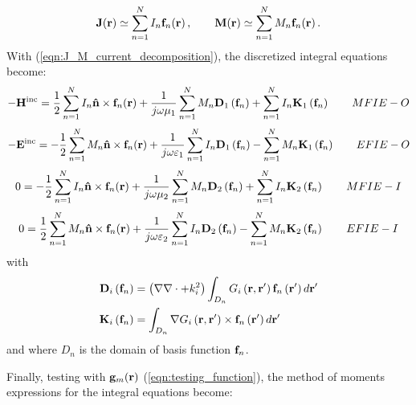\begin{equation}\label{eqn:J_M_current_decomposition}
\mathbf{J}\!\left(\mathbf{r}\right) \simeq \sum_{n = 1}^{N} I_n \mathbf{f}_n \!\left(\mathbf{r}\right), \qquad \mathbf{M}\!\left(\mathbf{r}\right) \simeq \sum_{n = 1}^{N} M_n \mathbf{f}_n \!\left(\mathbf{r}\right).
\end{equation}
With (\ref{eqn:J_M_current_decomposition}), the discretized integral equations become:
\begin{equation}
-\mathbf{H}^\text{inc} =  \frac{1}{2} \sum_{n=1}^N I_n \mathbf{\hat{n}} \times \mathbf{f}_n\!\left(\mathbf{r}\right) + \frac{1}{j \omega \mu_1} \sum_{n=1}^{N} M_n \mathbf{D}_1\left(\mathbf{f}_n\right) + \sum_{n=1}^{N} I_n \mathbf{K}_1\left(\mathbf{f}_n\right) \qquad MFIE-O 
\end{equation}
\begin{equation}
-\mathbf{E}^\text{inc} =  -\frac{1}{2} \sum_{n=1}^N M_n \mathbf{\hat{n}} \times \mathbf{f}_n\!\left(\mathbf{r}\right) + \frac{1}{j \omega \varepsilon_1} \sum_{n=1}^{N} I_n \mathbf{D}_1\left(\mathbf{f}_n\right) -  \sum_{n=1}^{N} M_n \mathbf{K}_1\left(\mathbf{f}_n\right) \qquad EFIE-O 
\end{equation}
\begin{equation}
0 =  -\frac{1}{2} \sum_{n=1}^N I_n \mathbf{\hat{n}} \times \mathbf{f}_n\!\left(\mathbf{r}\right) + \frac{1}{j \omega \mu_2} \sum_{n=1}^{N} M_n \mathbf{D}_2\left(\mathbf{f}_n\right) +  \sum_{n=1}^{N} I_n \mathbf{K}_2\left(\mathbf{f}_n\right) \qquad MFIE-I 
\end{equation}
\begin{equation}
0 =  \frac{1}{2} \sum_{n=1}^N M_n \mathbf{\hat{n}} \times \mathbf{f}_n\!\left(\mathbf{r}\right) + \frac{1}{j \omega \varepsilon_2} \sum_{n=1}^{N} I_n \mathbf{D}_2\left(\mathbf{f}_n\right) -  \sum_{n=1}^{N} M_n \mathbf{K}_2\left(\mathbf{f}_n\right) \qquad EFIE-I 
\end{equation}
with
\begin{align*}
\mathbf{D}_i\left(\mathbf{f}_n\right) &= \left(\nabla \nabla \cdot + k_i^2\right) \int_{D_n} G_i\left(\mathbf{r}, \mathbf{r}'\right) \mathbf{f}_n\left(\mathbf{r}'\right) d\mathbf{r}' \\
\mathbf{K}_i\left(\mathbf{f}_n\right) &= \int_{D_n} \nabla G_i\left(\mathbf{r}, \mathbf{r}'\right) \times \mathbf{f}_n\left(\mathbf{r}'\right) d\mathbf{r}'
\end{align*}
and where $D_n$ is the domain of basis function $\mathbf{f}_n$.
%
\par
Finally, testing with $\mathbf{g}_m \!\left(\mathbf{r}\right)$ (\ref{eqn:testing_function}), the method of moments expressions for the integral equations become:
